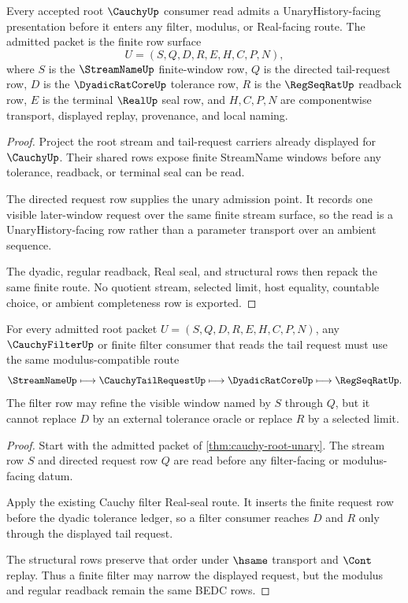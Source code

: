 \begin{theorem}
\label{thm:cauchy-root-unary}
Every accepted root $\CauchyUp$ consumer read admits a UnaryHistory-facing presentation before it enters any filter, modulus, or Real-facing route. The admitted packet is the finite row surface
$$
U=(S,Q,D,R,E,H,C,P,N),
$$
where $S$ is the $\StreamNameUp$ finite-window row, $Q$ is the directed tail-request row, $D$ is the $\DyadicRatCoreUp$ tolerance row, $R$ is the $\RegSeqRatUp$ readback row, $E$ is the terminal $\RealUp$ seal row, and $H,C,P,N$ are componentwise transport, displayed replay, provenance, and local naming.
\end{theorem}
\begin{proof}
Project the root stream and tail-request carriers already displayed for $\CauchyUp$. Their shared rows expose finite StreamName windows before any tolerance, readback, or terminal seal can be read.

The directed request row supplies the unary admission point. It records one visible later-window request over the same finite stream surface, so the read is a UnaryHistory-facing row rather than a parameter transport over an ambient sequence.

The dyadic, regular readback, Real seal, and structural rows then repack the same finite route. No quotient stream, selected limit, host equality, countable choice, or ambient completeness row is exported.
\end{proof}

\begin{theorem}
\label{thm:cauchy-root-filter-modulus}
For every admitted root packet $U=(S,Q,D,R,E,H,C,P,N)$, any $\CauchyFilterUp$ or finite filter consumer that reads the tail request must use the same modulus-compatible route
$$
\StreamNameUp \longmapsto \CauchyTailRequestUp \longmapsto \DyadicRatCoreUp \longmapsto \RegSeqRatUp .
$$
The filter row may refine the visible window named by $S$ through $Q$, but it cannot replace $D$ by an external tolerance oracle or replace $R$ by a selected limit.
\end{theorem}
\begin{proof}
Start with the admitted packet of \autoref{thm:cauchy-root-unary}. The stream row $S$ and directed request row $Q$ are read before any filter-facing or modulus-facing datum.

Apply the existing Cauchy filter Real-seal route. It inserts the finite request row before the dyadic tolerance ledger, so a filter consumer reaches $D$ and $R$ only through the displayed tail request.

The structural rows preserve that order under $\hsame$ transport and $\Cont$ replay. Thus a finite filter may narrow the displayed request, but the modulus and regular readback remain the same BEDC rows.
\end{proof}

